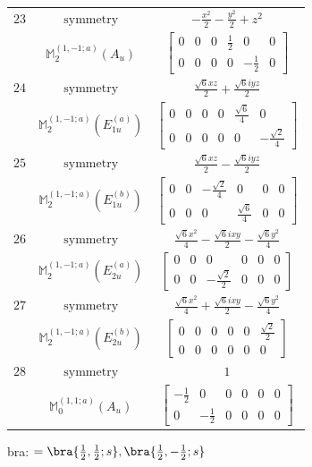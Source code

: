\documentclass[fleqn,8pt,landscape]{jsarticle}
\begin{document}
\begin{longtable}{ccc}
$ 23 $ & $ \text{symmetry} $ & $ - \frac{x^{2}}{2} - \frac{y^{2}}{2} + z^{2} $ \\
$  $ & $ \mathbb{M}_{2}^{(1,-1;a)}(A_{u}) $ & $ \begin{bmatrix} 0 & 0 & 0 & \frac{1}{2} & 0 & 0 \\ 0 & 0 & 0 & 0 & - \frac{1}{2} & 0 \end{bmatrix} $ \\ \hline
$ 24 $ & $ \text{symmetry} $ & $ \frac{\sqrt{6} x z}{2} + \frac{\sqrt{6} i y z}{2} $ \\
$  $ & $ \mathbb{M}_{2}^{(1,-1;a)}(E_{1u}^{(a)}) $ & $ \begin{bmatrix} 0 & 0 & 0 & 0 & \frac{\sqrt{6}}{4} & 0 \\ 0 & 0 & 0 & 0 & 0 & - \frac{\sqrt{2}}{4} \end{bmatrix} $ \\ \hline
$ 25 $ & $ \text{symmetry} $ & $ \frac{\sqrt{6} x z}{2} - \frac{\sqrt{6} i y z}{2} $ \\
$  $ & $ \mathbb{M}_{2}^{(1,-1;a)}(E_{1u}^{(b)}) $ & $ \begin{bmatrix} 0 & 0 & - \frac{\sqrt{2}}{4} & 0 & 0 & 0 \\ 0 & 0 & 0 & \frac{\sqrt{6}}{4} & 0 & 0 \end{bmatrix} $ \\ \hline
$ 26 $ & $ \text{symmetry} $ & $ \frac{\sqrt{6} x^{2}}{4} - \frac{\sqrt{6} i x y}{2} - \frac{\sqrt{6} y^{2}}{4} $ \\
$  $ & $ \mathbb{M}_{2}^{(1,-1;a)}(E_{2u}^{(a)}) $ & $ \begin{bmatrix} 0 & 0 & 0 & 0 & 0 & 0 \\ 0 & 0 & - \frac{\sqrt{2}}{2} & 0 & 0 & 0 \end{bmatrix} $ \\ \hline
$ 27 $ & $ \text{symmetry} $ & $ \frac{\sqrt{6} x^{2}}{4} + \frac{\sqrt{6} i x y}{2} - \frac{\sqrt{6} y^{2}}{4} $ \\
$  $ & $ \mathbb{M}_{2}^{(1,-1;a)}(E_{2u}^{(b)}) $ & $ \begin{bmatrix} 0 & 0 & 0 & 0 & 0 & \frac{\sqrt{2}}{2} \\ 0 & 0 & 0 & 0 & 0 & 0 \end{bmatrix} $ \\ \hline
$ 28 $ & $ \text{symmetry} $ & $ 1 $ \\
$  $ & $ \mathbb{M}_{0}^{(1,1;a)}(A_{u}) $ & $ \begin{bmatrix} - \frac{1}{2} & 0 & 0 & 0 & 0 & 0 \\ 0 & - \frac{1}{2} & 0 & 0 & 0 & 0 \end{bmatrix} $ \\ \hline
\end{longtable}
bra: $=\bra{\frac{1}{2},\frac{1}{2};s}, \bra{\frac{1}{2},- \frac{1}{2};s}$
\end{document}
